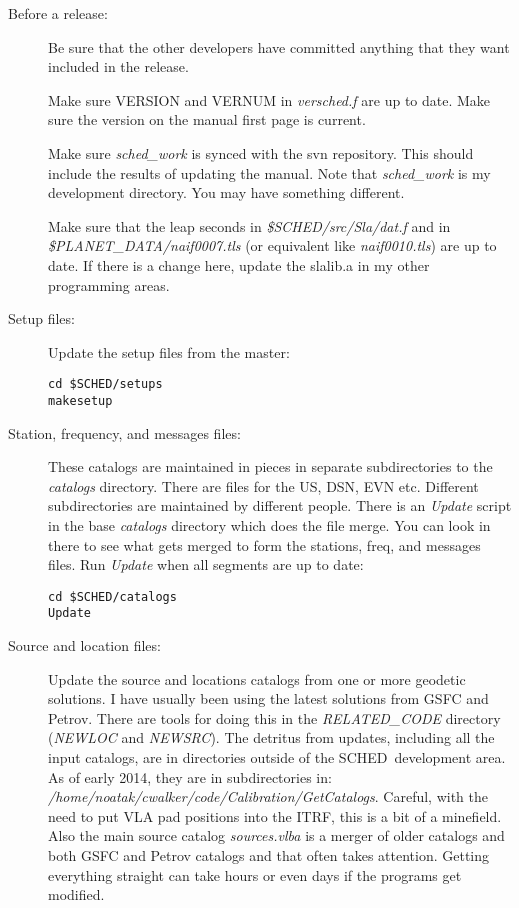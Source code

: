 \documentclass{report}
\newcommand{\schedb}{{\sc SCHED~}}
\begin{document}
\begin{description}

\item [Before a release:]

Be sure that the other developers have committed anything that they
want included in the release.

Make sure VERSION and VERNUM in {\sl versched.f} are up to date.
Make sure the version on the manual first page is current.

Make sure {\sl sched\_work} is synced with the svn repository.  This
should include the results of updating the manual.  Note that {\sl
sched\_work} is my development directory.  You may have something
different.

Make sure that the leap seconds in {\sl \$SCHED/src/Sla/dat.f} and
in {\sl \$PLANET\_DATA/naif0007.tls} (or equivalent like {\sl naif0010.tls}) 
are up to date.  If there is a change here, update the slalib.a 
in my other programming areas.

\item [Setup files:]

Update the setup files from the master:

\begin{verbatim}
cd $SCHED/setups
makesetup
\end{verbatim}

\item [Station, frequency, and messages files:]

These catalogs are maintained in pieces in separate subdirectories
to the {\sl catalogs} directory.  There are files for the US, DSN, 
EVN etc.  Different subdirectories are maintained by different people.
There is an {\sl Update} script in the base {\sl catalogs} directory
which does the file merge.  You can look in there to see what gets merged
to form the stations, freq, and messages files.  Run {\sl Update} when
all segments are up to date:

\begin{verbatim}
cd $SCHED/catalogs
Update
\end{verbatim}


\item [Source and location files:]

Update the source and locations catalogs from one or more geodetic
solutions.  I have usually been using the latest solutions from GSFC
and Petrov.  There are tools for doing this in the {\sl RELATED\_CODE}
directory ({\sl NEWLOC} and {\sl NEWSRC}).  The detritus from updates,
including all the input catalogs, are in directories outside of the
\schedb development area.  As of early 2014, they are in
subdirectories in: {\sl
/home/noatak/cwalker/code/Calibration/GetCatalogs}.  Careful, with the
need to put VLA pad positions into the ITRF, this is a bit of a
minefield.  Also the main source catalog {\sl sources.vlba} is a
merger of older catalogs and both GSFC and Petrov catalogs and that
often takes attention.  Getting everything straight can take hours or
even days if the programs get modified.


\end{description}
\end{document}
